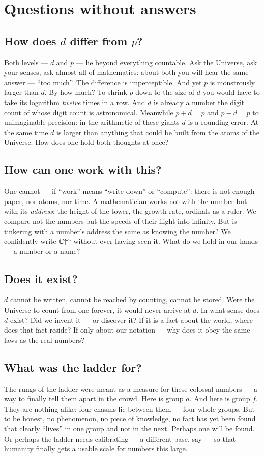 \section{Questions without answers}

\subsection{How does \(d\) differ from \(p\)?}
Both levels --- \(d\) and \(p\) --- lie beyond everything countable. Ask the Universe, ask
your senses, ask almost all of mathematics: about both you will hear the same answer ---
``too much''. The difference is imperceptible. And yet \(p\) is monstrously larger than
\(d\). By how much? To shrink \(p\) down to the size of \(d\) you would have to take its
logarithm \emph{twelve} times in a row. And \(d\) is already a number the digit count of
whose digit count is astronomical. Meanwhile \(p+d=p\) and \(p-d=p\) to unimaginable
precision: in the arithmetic of these giants \(d\) is a rounding error. At the same time
\(d\) is larger than anything that could be built from the atoms of the Universe. How does
one hold both thoughts at once?

\subsection{How can one work with this?}
One cannot --- if ``work'' means ``write down'' or ``compute'': there is not enough paper,
nor atoms, nor time. A mathematician works not with the number but with its \emph{address}:
the height of the tower, the growth rate, ordinals as a ruler. We compare not the numbers
but the speeds of their flight into infinity. But is tinkering with a number's address the
same as knowing the number? We confidently write \(\mathbb{C}\mkern-1.5mu{\uparrow\uparrow}\) without ever having seen it.
What do we hold in our hands --- a number or a name?

\subsection{Does it exist?}
\(d\) cannot be written, cannot be reached by counting, cannot be stored. Were the Universe
to count from one forever, it would never arrive at \(d\). In what sense does \(d\) exist?
Did we invent it --- or discover it? If it is a fact about the world, where does that fact
reside? If only about our notation --- why does it obey the same laws as the real numbers?

\subsection{What was the ladder for?}
The rungs of the ladder were meant as a measure for these colossal numbers --- a way to finally tell them
apart in the crowd. Here is group \(a\). And here is group \(f\). They are nothing alike:
four chasms lie between them --- four whole groups. But to be honest, no phenomenon, no
piece of knowledge, no fact has yet been found that clearly ``lives'' in one group and not
in the next. Perhaps one will be found. Or perhaps the ladder needs calibrating --- a
different base, say --- so that humanity finally gets a usable scale for numbers this large.

